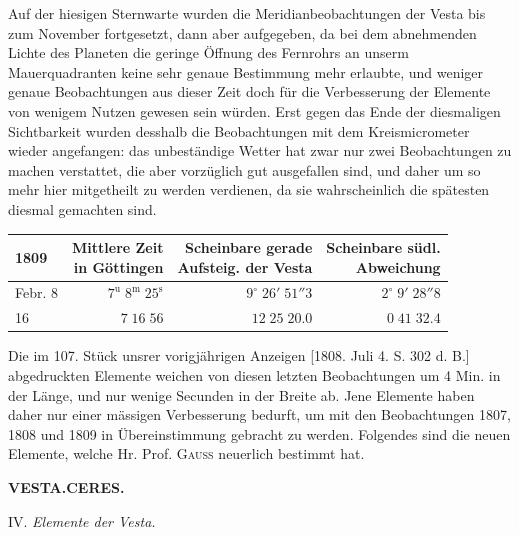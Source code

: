 \par\indent Auf der hiesigen Sternwarte wurden die Meridianbeobachtungen der Vesta bis zum November fortgesetzt, dann aber aufgegeben, da bei dem abnehmenden Lichte des Planeten die geringe Öffnung des Fernrohrs an unserm Mauerquadranten keine sehr genaue Bestimmung mehr erlaubte, und weniger genaue Beobachtungen aus dieser Zeit doch für die Verbesserung der Elemente von wenigem Nutzen gewesen sein würden. Erst gegen das Ende der diesmaligen Sichtbarkeit wurden desshalb die Beobachtungen mit dem Kreismicrometer wieder angefangen: das unbeständige Wetter hat zwar nur zwei Beobachtungen zu machen verstattet, die aber vorzüglich gut ausgefallen sind, und daher um so mehr hier
mitgetheilt zu werden verdienen, da sie wahrscheinlich die spätesten diesmal gemachten sind.


\begin{center}\fontsize{10}{12}\selectfont\setlength{\tabcolsep}{5pt}\renewcommand{\arraystretch}{1.15}\begin{tabular}{lrrr}
1809 & \shortstack{Mittlere Zeit\\in Göttingen} & \shortstack{Scheinbare gerade\\Aufsteig. der Vesta} & \shortstack{Scheinbare südl.\\Abweichung}\\
\hline
Febr. 8 & $7^{\text{u}}\;8^{\text{m}}\;25^{\text{s}}$ & $9^\circ\;26'\;51''3$ & $2^\circ\;9'\;28''8$\\
16 & $7\;16\;56$ & $12\;25\;20.0$ & $0\;41\;32.4$\\
\end{tabular}\end{center}


\par\indent Die im 107. Stück unsrer vorigjährigen Anzeigen [1808. Juli 4. S. 302 d. B.] abgedruckten Elemente weichen von diesen letzten Beobachtungen um 4 Min. in der Länge, und nur wenige Secunden in der Breite ab. Jene Elemente haben daher nur einer mässigen Verbesserung bedurft, um mit den Beobachtungen 1807, 1808 und 1809 in Übereinstimmung gebracht zu werden. Folgendes sind die neuen Elemente, welche Hr. Prof. \textsc{Gauss} neuerlich bestimmt hat.



\clearpage
\thispagestyle{empty}
\noindent{}%
\makebox[12mm][l]{}%
\parbox[t]{\dimexpr\linewidth-24mm\relax}{\centering\footnotesize\bfseries VESTA.\quad CERES.\par}%
\par\nobreak\medskip
\begin{center}
IV. \emph{Elemente der Vesta.}
\end{center}


